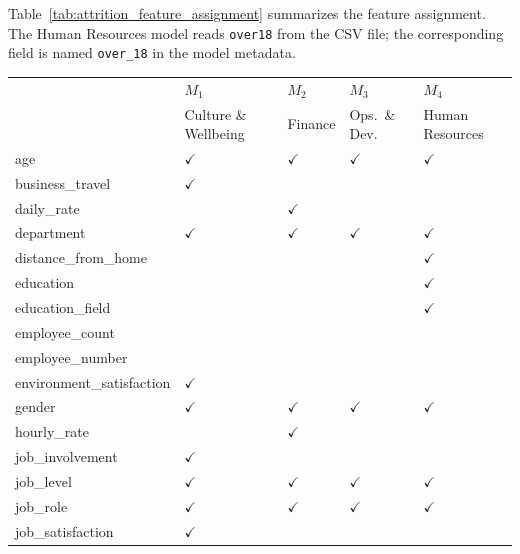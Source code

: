 \documentclass{interact}
\begin{document}
Table~\ref{tab:attrition_feature_assignment} summarizes the feature assignment. The Human Resources model reads \texttt{over18} from the CSV file; the corresponding field is named \texttt{over\_18} in the model metadata.

\begin{table}[!tbh]
{\footnotesize
\begin{tabularx}{\textwidth}{%
  >{\raggedright\arraybackslash\ttfamily}X
  >{\centering\arraybackslash}p{1.55cm}
  >{\centering\arraybackslash}p{1.55cm} 
  >{\centering\arraybackslash}p{1.55cm}
  >{\centering\arraybackslash}p{1.55cm}
}
\toprule
\multicolumn{1}{l}{\normalfont\textbf{Predictor}} &
\textbf{\boldmath$M_1$} &
\textbf{\boldmath$M_2$} &
\textbf{\boldmath$M_3$} &
\textbf{\boldmath$M_4$} \\
& {\scriptsize Culture \& Wellbeing} &
{\scriptsize Finance} &
{\scriptsize Ops.\ \& Dev.} &
{\scriptsize Human Resources} \\
\midrule
age & $\checkmark$ & $\checkmark$ & $\checkmark$ & $\checkmark$ \\
business\_travel & $\checkmark$ &  &  &  \\
daily\_rate &  & $\checkmark$ &  &  \\
department & $\checkmark$ & $\checkmark$ & $\checkmark$ & $\checkmark$ \\
distance\_from\_home &  &  &  & $\checkmark$ \\
education &  &  &  & $\checkmark$ \\
education\_field &  &  &  & $\checkmark$ \\
employee\_count &  &  &  &  \\
employee\_number &  &  &  &  \\
environment\_satisfaction & $\checkmark$ &  &  &  \\
gender & $\checkmark$ & $\checkmark$ & $\checkmark$ & $\checkmark$ \\
hourly\_rate &  & $\checkmark$ &  &  \\
job\_involvement & $\checkmark$ &  &  &  \\
job\_level & $\checkmark$ & $\checkmark$ & $\checkmark$ & $\checkmark$ \\
job\_role & $\checkmark$ & $\checkmark$ & $\checkmark$ & $\checkmark$ \\
job\_satisfaction & $\checkmark$ &  &  &  \\

\end{tabularx}}
\end{table}
\end{document}
